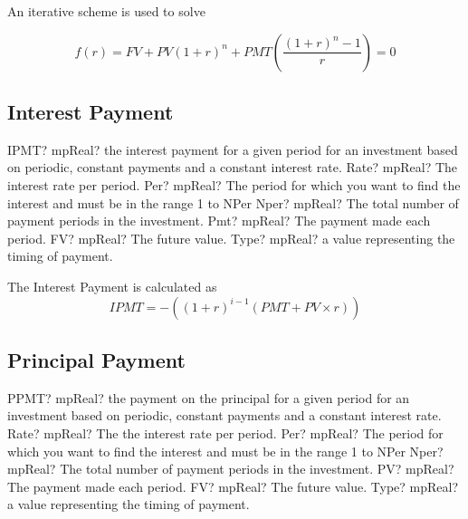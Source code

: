 An iterative scheme is used to solve

\begin{equation}
	f(r) = FV + PV(1+r)^n + PMT \left( \frac{(1+r)^n-1}{r} \right) = 0
\end{equation}





\subsection{Interest Payment}

\begin{mpFunctionsExtract}
	\mpWorksheetFunctionSixNotImplemented
	{IPMT? mpReal? the interest payment for a given period for an investment based on periodic, constant payments and a constant interest rate.}
	{Rate? mpReal? The interest rate per period.}
	{Per? mpReal? The period for which you want to find the interest and must be in the range 1 to NPer}
	{Nper? mpReal? The total number of payment periods in the investment.}
	{Pmt? mpReal? The payment made each period.}
	{FV? mpReal? The future value.}
	{Type? mpReal? a value representing the timing of payment.}
\end{mpFunctionsExtract}

\vspace{0.3cm}
The Interest Payment is calculated as
\begin{equation}
	IPMT = -\left( (1+r)^{i-1} (PMT + PV \times r)\right)
\end{equation}




\subsection{Principal Payment}

\begin{mpFunctionsExtract}
	\mpWorksheetFunctionSixNotImplemented
	{PPMT? mpReal? the payment on the principal for a given period for an investment based on periodic, constant payments and a constant interest rate.}
	{Rate? mpReal? The the interest rate per period.}
	{Per? mpReal? The period for which you want to find the interest and must be in the range 1 to NPer}
	{Nper? mpReal? The total number of payment periods in the investment.}
	{PV? mpReal? The payment made each period.}
	{FV? mpReal? The future value.}
	{Type? mpReal? a value representing the timing of payment.}
\end{mpFunctionsExtract}

